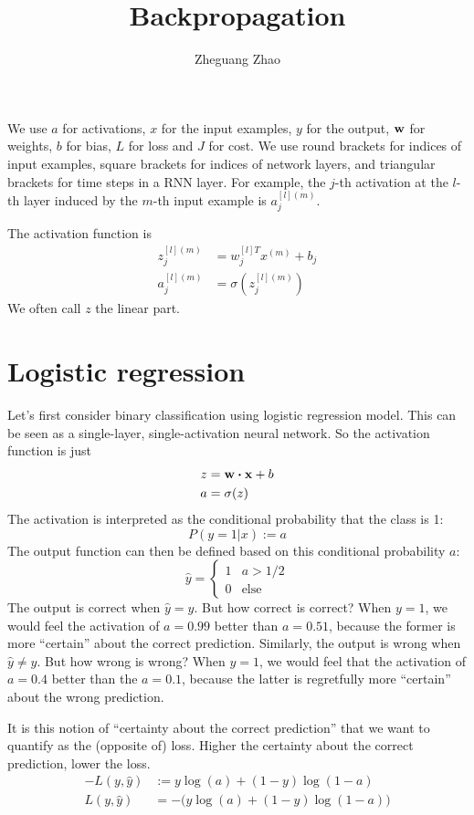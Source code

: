 \documentclass[11pt]{article}
\begin{document}
\title{Backpropagation}
\author{Zheguang Zhao}
\date{}
\maketitle

We use $a$ for activations,  $x$ for the input examples, $y$ for the output, $\vb{w}$ for weights, $b$ for bias, $L$ for loss and $J$ for cost.
We use round brackets for indices of input examples,  square brackets for indices of network layers, and triangular brackets for time steps in a RNN layer.
For example, the $j$-th activation at the $l$-th layer induced by the $m$-th input example is $a^{[l](m)}_j$.

The activation function is
\begin{align*}
	z_j^{[l](m)} &= w_j^{[l]T} x^{(m)} + b_j \\
	a_j^{[l](m)} &= \sigma(z_j^{[l](m)})
\end{align*}
We often call $z$ the linear part.

\section{Logistic regression}

Let's first consider binary classification using logistic regression model.  This can be seen as a single-layer, single-activation neural network.
So the activation function is just
\begin{align*}
	z &= \vb{w} \vdot \vb{x} + b \\
	a &= \sigma(z)
\end{align*}
The activation is interpreted as the conditional probability that the class is 1:
$$
P(y = 1 | x) := a
$$
The output function can then be defined based on this conditional probability $a$:
$$
\hat{y} = 
	\begin{cases}
		1 & a > 1/2 \\
		0 & \text{else}
	\end{cases}
$$
The output is correct when $\hat{y} = y$.  But how correct is correct?  When $y = 1$, we would feel the activation of $a = 0.99$ better than $a = 0.51$, because the former is more ``certain'' about the correct prediction.  Similarly, the output is wrong when $\hat{y} \ne y$.  But how wrong is wrong?  When $y = 1$, we would feel that the activation of $a = 0.4$ better than the $a = 0.1$, because the latter is regretfully more ``certain'' about the wrong prediction.

It is this notion of ``certainty about the correct prediction'' that we want to quantify as the (opposite of) loss.  Higher the certainty about the correct prediction, lower the loss.
\begin{align*}
- L(y, \hat{y}) &:= y\log(a) + (1 - y)\log(1 - a) \\
L(y, \hat{y}) &= -\big( y\log(a) + (1 - y)\log(1 - a)\big)
\end{align*}
\end{document}
